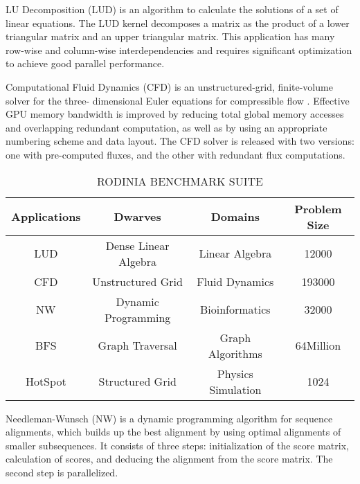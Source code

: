  LU Decomposition (LUD) is an algorithm to calculate the solutions of a set of linear equations. The LUD kernel decomposes a matrix as the product of a lower triangular matrix and an upper triangular matrix. This application has many row-wise and column-wise interdependencies and requires significant optimization to achieve good parallel performance.



  Computational Fluid Dynamics (CFD) is an unstructured-grid, finite-volume solver for the three- dimensional Euler equations for compressible flow \cite{R:26}. Effective GPU memory bandwidth is improved by reducing total global memory accesses and overlapping redundant computation, as well as by using an appropriate numbering scheme and data layout. The CFD solver is released with two versions: one with pre-computed fluxes, and the other with redundant flux computations.

\vspace{-2mm}

\begin{table}[htbp]
  \centering
    \caption{RODINIA BENCHMARK SUITE}
  \begin{adjustbox}{width=0.5\textwidth}
    \begin{tabular}{cccc}
    \toprule
    Applications & Dwarves & Domains & Problem Size  \\
    \midrule
    LUD & Dense Linear Algebra & Linear Algebra & 12000 \\
    CFD & Unstructured Grid & Fluid Dynamics & 193000 \\
    NW & Dynamic Programming & Bioinformatics & 32000 \\
    BFS & Graph Traversal & Graph Algorithms & 64Million \\
    HotSpot & Structured Grid & Physics Simulation & 1024 \\
    \bottomrule
    \end{tabular}%
    \label{tab:benchmarks}
  \end{adjustbox}

\end{table}%

\vspace{-1mm}

  Needleman-Wunsch (NW) is a dynamic programming algorithm for sequence alignments, which builds up the best alignment by using optimal alignments of smaller subsequences. It consists of three steps: initialization of the score matrix, calculation of scores, and deducing the alignment from the score matrix. The second step is parallelized.

